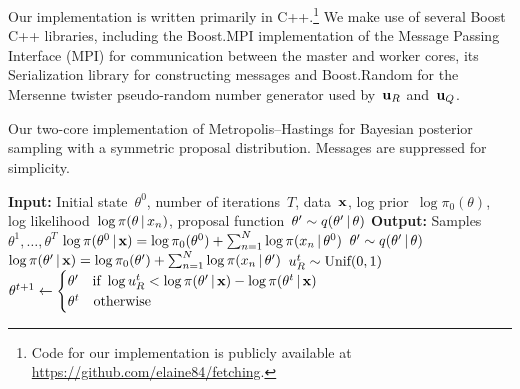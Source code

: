 \documentclass[angelino.tex]{subfiles}
\begin{document}
Our implementation is written primarily in C++.\footnote{Code for our
implementation is publicly available at \url{https://github.com/elaine84/fetching}.}
%
We make use of several Boost C++ libraries,
including the Boost.MPI implementation of the Message Passing Interface (MPI)
for communication between the master and worker cores,
its Serialization library for constructing messages
and Boost.Random for the Mersenne twister pseudo-random number generator
used by~$\mathbf{u}_R$ and~$\mathbf{u}_Q$.

\begin{algorithm}[t]
\caption{Our two-core implementation of Metropolis--Hastings for Bayesian posterior sampling with a symmetric proposal distribution. Messages are suppressed for simplicity.}
\label{mh-bayesian}
\begin{algorithmic}
\State \textbf{Input:} Initial state~$\theta^0$, number of iterations~$T$, data~$\mathbf{x}$, log prior~$\log \pi_0(\theta)$, log likelihood~$\log \pi(\theta \,|\, x_n)$, proposal function~${\theta' \sim q(\theta' \,|\, \theta)}$
\State \textbf{Output:} Samples $\theta^1, \dots, \theta^T$
\vspace{1mm}
\State $\log \pi(\theta^0 \,|\, \mathbf{x}) =  \log \pi_0(\theta^0) + \sum_{n=1}^N \log \pi(x_n \,|\, \theta^0)$
\vspace{1mm}
\vspace{1mm}
\State $\theta' \sim q(\theta' \,|\, \theta)$
\vspace{1mm}
\State $\log \pi(\theta' \,|\, \mathbf{x}) =  \log \pi_0(\theta') + \sum_{n=1}^N \log \pi(x_n \,|\, \theta')$
\vspace{1mm}
\State $u_R^t \sim \mbox{Unif}(0, 1)$
\vspace{1mm}
\State $\theta^{t+1} \gets
\begin{cases}
\theta' \quad \text{if}~\log u_R^t < \log \pi(\theta' \,|\, \mathbf{x}) - \log \pi(\theta^t \,|\, \mathbf{x}) \\
\theta^t \quad \text{otherwise}
\end{cases}$
\EndFor
\end{algorithmic}
\end{algorithm}
\end{document}
